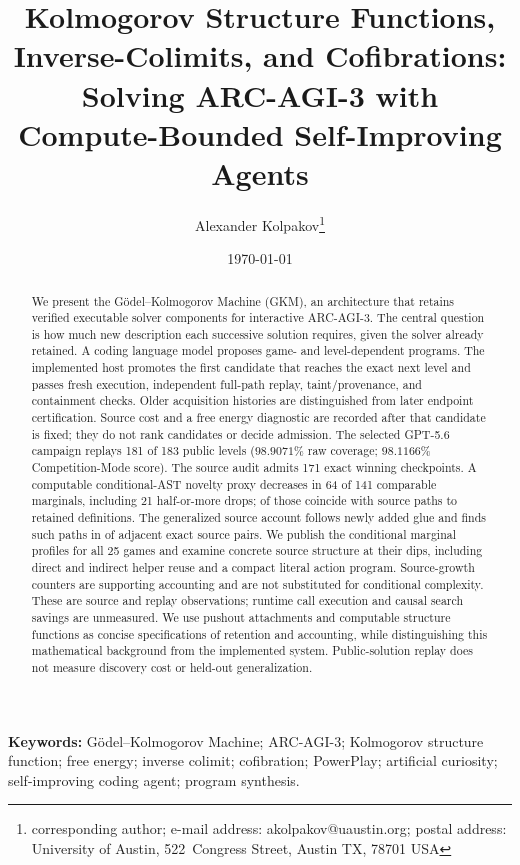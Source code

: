 \documentclass[11pt]{article}
\title{Kolmogorov Structure Functions, Inverse-Colimits, and Cofibrations: Solving ARC-AGI-3 with Compute-Bounded Self-Improving Agents}
\author{Alexander Kolpakov\footnote{corresponding author; e-mail address: akolpakov@uaustin.org; postal address: University of Austin, 522~Congress Street, Austin TX, 78701 USA}}
\date{\today}
\theoremstyle{definition}
\theoremstyle{remark}
\begin{document}
\maketitle
\raggedbottom

\begin{abstract}
We present the G\"odel--Kolmogorov Machine (GKM), an architecture that retains
verified executable solver components for interactive ARC-AGI-3. The central question
is how much new description each successive solution requires, given the solver
already retained. A coding language model proposes game- and
level-dependent programs. The implemented host promotes the first candidate that reaches
the exact next level and passes fresh execution, independent full-path replay,
taint/provenance, and containment checks. Older acquisition histories are distinguished
from later endpoint certification. Source cost and a free energy diagnostic
are recorded after that candidate is fixed; they do not rank candidates or decide
admission. The selected GPT-5.6 campaign replays 181 of 183 public levels
($98.9071\%$ raw coverage; $98.1166\%$ Competition-Mode score). The source audit
admits 171 exact winning checkpoints. A computable conditional-AST novelty proxy
decreases in 64 of 141 comparable marginals, including 21 half-or-more drops;
\GKMGeneralSharpPaths{} of those coincide with source paths to retained definitions.
The generalized source account follows newly added glue and finds such paths in
\GKMGeneralPaths{} of \GKMGeneralPairs{} adjacent exact source pairs. We publish
the conditional marginal profiles for all 25 games and examine concrete source
structure at their dips, including direct and indirect helper reuse and a compact
literal action program. Source-growth counters are supporting accounting and are
not substituted for conditional complexity. These are source and replay observations; runtime call
execution and causal search savings are unmeasured. We use pushout attachments and
computable structure functions as concise specifications of retention and accounting,
while distinguishing this mathematical background from the implemented system.
Public-solution replay does not measure discovery cost or held-out generalization.
\end{abstract}

\textbf{Keywords:} G\"odel--Kolmogorov Machine; ARC-AGI-3; Kolmogorov
structure function; free energy; inverse colimit; cofibration; PowerPlay; artificial
curiosity; self-improving coding agent; program synthesis.
\end{document}
